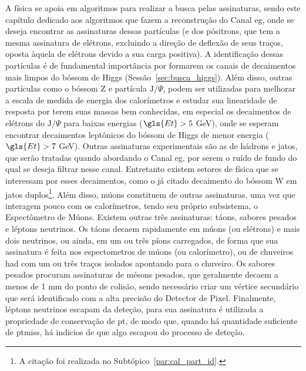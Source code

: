 A física se apoia em algoritmos
para realizar a busca pelas assinaturas, sendo este capítulo dedicado aos
algoritmos que fazem a reconstrução do Canal \gls{eg},
onde se deseja encontrar as assinaturas dessas partículas (e dos pósitrons, que
tem a mesma assinatura de elétrons, excluindo a direção de deflexão de seus
traços, oposta àquela de elétrons devido a sua carga positiva). A identificação
dessas partículas é de fundamental importância por formarem os canais de
decaimentos mais limpos do bóssom de Higgs (Sessão~\ref{sec:busca_higgs}). Além
disso, outras partículas como o bóssom Z e partícula $\text{J}/\Psi$, podem ser
utilizadas para melhorar a escala de medida de energia dos calorímetros e
estudar sua linearidade de resposta por terem suas massas bem conhecidas, 
em especial os decaimentos de elétrons do
$\text{J}/\Psi$ para baixas energias ($\gls{Et} > 5$ GeV), onde se esperam encontrar 
decaimentos leptônicos do bóssom de Higgs de menor energia ($\gls{Et} > 7$ GeV).
Outras assinaturas experimentais são as de hádrons e jatos, que serão tratadas
quando abordando o Canal \gls{eg}, por serem o ruído de fundo do qual se deseja
filtrar nesse canal. Entretanto existem setores de física que se
interessam por esses decaimentos, como o já citado decaimento do bóssom W em jatos
duplos\footnote{A citação foi realizada no Subtópico~\ref{par:cal_part_id}.}. 
Além disso, múons constituem de outras assinaturas, uma vez que interagem
pouco com os calorímetros, tendo seu próprio subsistema, o Espectômetro de
Múons. Existem outras três assinaturas:
táons, sabores pesados e léptons neutrinos. Os táons decaem
rapidamente em múons (ou elétrons) e mais dois neutrinos, ou ainda, em um ou três
píons carregados, de forma que sua assinatura é
feita nos espectometros de múons (ou calorímetro), ou de chuveiros \gls{had} com um ou três
traços isolados apontando para o chuveiro. Os sabores pesados procuram
assinaturas de mésons pesados, que geralmente decaem a menos de 1 mm do ponto de
colisão, sendo necessário criar um vértice secundário que será identificado com
a alta precisão do Detector de Pixel. Finalmente, léptons neutrinos escapam da
deteção, para sua assinatura é utilizada a propriedade de conservação de
\gls{pt}, de modo que, quando há quantidade suficiente de \gls{ptmiss}, há indicios
de que algo escapou do processo de deteção.

